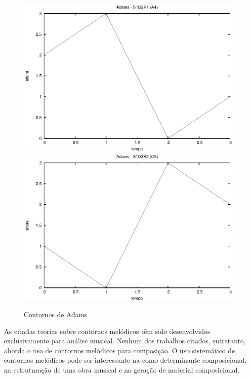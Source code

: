 \documentclass{article}
\begin{document}
\begin{figure}[h]
  \begin{minipage}{1.0\linewidth}
    \includegraphics[scale=.6]{a4}
    \includegraphics[scale=.6]{c5}
    \centering
  \end{minipage}
  \caption{Contornos de Adams}
  \label{fig:adams}
\end{figure}



As citadas teorias sobre contornos melódicos têm sido desenvolvidos
exclusivamente para análise musical. Nenhum dos trabalhos citados,
entretanto, aborda o uso de contornos melódicos para composição. O uso
sistemático de contornos melódicos pode ser interessante na como
determinante composicional, na estruturação de uma obra musical e na
geração de material composicional.
\end{document}
